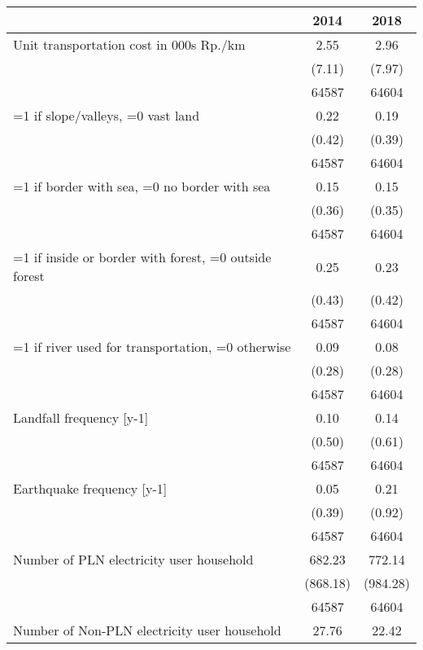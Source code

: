 \begin{tabular}{l*{2}{c}}
\hline\hline
                    &        2014&        2018\\
\hline
Unit transportation cost in 000s Rp./km&        2.55&        2.96\\
                    &      (7.11)&      (7.97)\\
                    &       64587&       64604\\
[1em]
=1 if slope/valleys, =0 vast land&        0.22&        0.19\\
                    &      (0.42)&      (0.39)\\
                    &       64587&       64604\\
[1em]
=1 if border with sea, =0 no border with sea&        0.15&        0.15\\
                    &      (0.36)&      (0.35)\\
                    &       64587&       64604\\
[1em]
=1 if inside or border with forest, =0 outside forest&        0.25&        0.23\\
                    &      (0.43)&      (0.42)\\
                    &       64587&       64604\\
[1em]
=1 if river used for transportation, =0 otherwise&        0.09&        0.08\\
                    &      (0.28)&      (0.28)\\
                    &       64587&       64604\\
[1em]
Landfall frequency [y-1]&        0.10&        0.14\\
                    &      (0.50)&      (0.61)\\
                    &       64587&       64604\\
[1em]
Earthquake frequency [y-1]&        0.05&        0.21\\
                    &      (0.39)&      (0.92)\\
                    &       64587&       64604\\
[1em]
Number of PLN electricity user household&      682.23&      772.14\\
                    &    (868.18)&    (984.28)\\
                    &       64587&       64604\\
[1em]
Number of Non-PLN electricity user household&       27.76&       22.42\\

\end{tabular}
